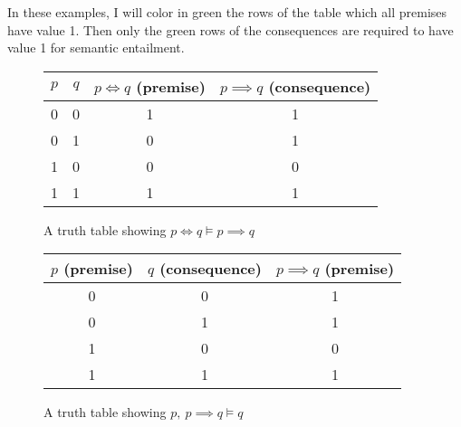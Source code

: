 \documentclass[11pt]{article}
\begin{document}
\begin{egs} In these examples, I will color in green the rows of the table which all premises have value 1. Then only the green rows of the consequences are required to have value 1 for semantic entailment.
    \begin{figure}[H]
        \caption{A truth table showing $p \iff q \vDash p \implies q$}
        \label{fig:TruthTableSemanticEntailment1}
        \centering
        \begin{tabular}{|c|c|c|c|}
            \hline
            $p$ & $q$  & $p \iff q$ (premise) & $p \implies q$ (consequence) \\ \hline
            \rowcolor{green!40} 0 & 0 & 1 & 1 \\
            0 & 1 & 0 & 1  \\
            1 & 0 & 0 & 0  \\
            \rowcolor{green!40} 1 & 1 & 1 & 1 \\ \hline
        \end{tabular}
    \end{figure}
    \begin{figure}[H]
        \caption{A truth table showing $p, \ p\implies q \vDash q$}
        \label{fig:TruthTableSemanticEntailment2}
        \centering
        \begin{tabular}{|c|c|c|}
            \hline
            $p$ (premise) & $q$ (consequence) & $p \implies q$ (premise)  \\ \hline
            0 & 0 & 1  \\
            0 & 1 & 1  \\
            1 & 0 & 0  \\
            \rowcolor{green!40} 1 & 1 & 1  \\ \hline
        \end{tabular}
    \end{figure}
\end{egs} 
\end{document}
